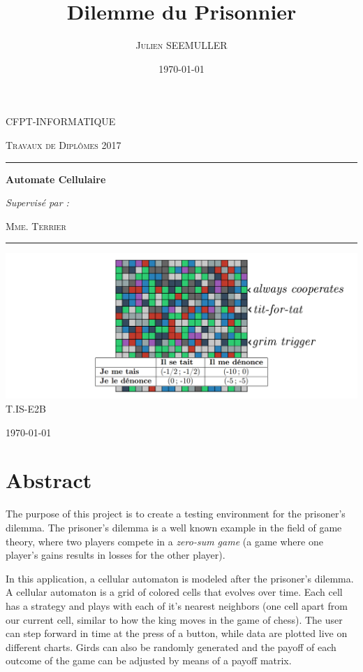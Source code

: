 \documentclass[a4paper]{article}
\title{Dilemme du Prisonnier}
\author{\textsc{Julien SEEMULLER}}
\date{\today}
\newcommand{\subtitle}{Automate Cellulaire}
\newcommand{\lesson}{Travaux de Diplômes 2017}
\newcommand{\class}{T.IS-E2B}
\newcommand{\teacher}{Mme. Terrier}
\begin{document}
\begin{titlepage}
	\centering
	{\scshape\LARGE CFPT-INFORMATIQUE \par}
	\vspace{0.25cm}
	{\scshape\lesson\par}
	\vspace{3cm}
	
	\hrule
	{\huge\bfseries\textsc\@title\par}
	{\Large\bfseries\textsc\subtitle\par}
	\vspace{0.5cm}
	{\itshape\@author\par}
	\vspace{1cm}
	{\textit{Supervisé par :}  \par \textsc{\teacher}}\par
	\vspace{0.5cm}
	\hrule
	
	\vfill
	\includegraphics[width=\linewidth]{logo.png}
	\vfill
	\textsc{\class}
	\vspace{1cm}
	
	{\large\today\par}
\end{titlepage}

\pagebreak


\section{Abstract}
The purpose of this project is to create a testing environment for the prisoner's dilemma. The prisoner's dilemma is a well known example in the field of game theory, where two players compete in a \textit{zero-sum game} (a game where one player's gains results in losses for the other player). 

In this application, a cellular automaton is modeled after the prisoner's dilemma. A cellular automaton is a grid of colored cells that evolves over time. Each cell has a strategy and plays with each of it's nearest neighbors (one cell apart from our current cell, similar to how the king moves in the game of chess). The user can step forward in time at the press of a button, while data are plotted live on different charts. Girds can also be randomly generated and the payoff of each outcome of the game can be adjusted by means of a payoff matrix.
\end{document}
